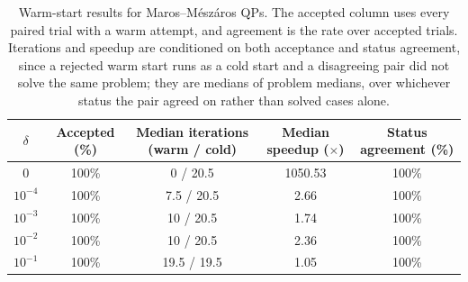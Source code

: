 \begin{table}[htbp]
\centering
\small
\caption{Warm-start results for Maros--M\'esz\'aros QPs. The accepted column uses every paired trial with a warm attempt, and agreement is the rate over accepted trials. Iterations and speedup are conditioned on both acceptance and status agreement, since a rejected warm start runs as a cold start and a disagreeing pair did not solve the same problem; they are medians of problem medians, over whichever status the pair agreed on rather than solved cases alone.}
\label{tab:warm-qp}
\begin{tabular}{ccccc}
\hline
$\delta$ & Accepted (\%) & Median iterations (warm / cold) & Median speedup ($\times$) & Status agreement (\%) \\
\hline
$0$ & 100\% & 0 / 20.5 & 1050.53 & 100\% \\
$10^{-4}$ & 100\% & 7.5 / 20.5 & 2.66 & 100\% \\
$10^{-3}$ & 100\% & 10 / 20.5 & 1.74 & 100\% \\
$10^{-2}$ & 100\% & 10 / 20.5 & 2.36 & 100\% \\
$10^{-1}$ & 100\% & 19.5 / 19.5 & 1.05 & 100\% \\
\hline
\end{tabular}
\end{table}
